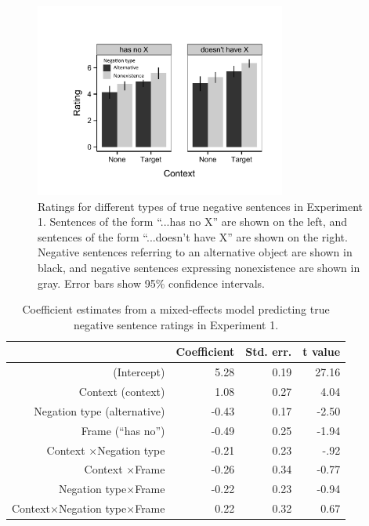 \documentclass[man, noapacite]{apa2}
\begin{document}
\begin{figure}
\begin{center} 
\includegraphics[width=3.25in]{figures/study1.pdf}
\caption{\label{fig:s1} Ratings for different types of true negative sentences in Experiment 1.  Sentences of the form ``...has no X'' are shown on the left, and sentences of the form ``...doesn't have X'' are shown on the right.  Negative sentences referring to an alternative object are shown in black, and negative sentences expressing nonexistence are shown in gray.  Error bars show 95\% confidence intervals.}
\vspace{-1.45cm}
\end{center} 
\end{figure}

\begin{table}[t]
\caption{\label{tab:s1} Coefficient estimates from a mixed-effects model predicting true negative sentence ratings in Experiment 1.}
\begin{center}
\small\addtolength{\tabcolsep}{-5pt}
\begin{tabular}{rrrr}
  \hline
 & Coefficient & Std. err. & t value \\ 
  \hline
(Intercept) & 5.28 & 0.19 & 27.16 \\ 
  Context (context) & 1.08 & 0.27 & 4.04  \\ 
  Negation type (alternative) & -0.43 & 0.17 & -2.50 \\
  Frame (``has no'') & -0.49 & 0.25 & -1.94 \\ 
  Context $\times$Negation type & -0.21 & 0.23 & -.92 \\
  Context $\times$Frame & -0.26 & 0.34 & -0.77 \\
  Negation type$\times$Frame & -0.22 & 0.23 & -0.94 \\
  Context$\times$Negation type$\times$Frame & 0.22 & 0.32 & 0.67 \\
   \hline
\end{tabular}
\end{center}
\end{table}
\end{document}
